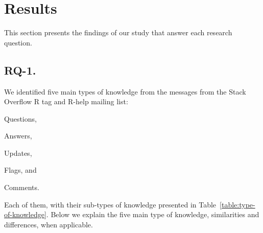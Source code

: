 \section{Results}
\label{cha:findings}

This section presents the findings of our study that answer each research question.

\subsection{RQ-1. \rqa}
\label{cha:findings-types}


We identified five main types of knowledge from the messages from the Stack Overflow R tag and R-help mailing list:
	\begin{enumerate*}[label=(\arabic*)]
        \item Questions,
        \item Answers,
        \item Updates,
        \item Flags, and
        \item Comments.
	\end{enumerate*}
    Each of them, with their sub-types of knowledge presented in Table~\ref{table:type-of-knowledge}.
    Below we explain the five main type of knowledge, similarities and differences, when applicable.

